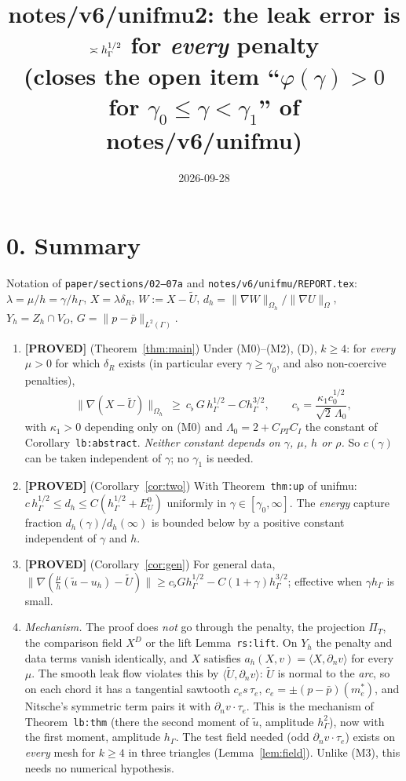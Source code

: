 \documentclass[11pt]{article}
\title{notes/v6/unifmu2: the leak error is $\asymp\hG^{1/2}$ for \emph{every} penalty\\
\large (closes the open item ``$\varphi(\gamma)>0$ for $\gamma_0\le\gamma<\gamma_1$'' of notes/v6/unifmu)}
\date{2026-09-28}
\theoremstyle{remark}
\newcommand{\hG}{h_\Gamma}
\newcommand{\Oh}{\Omega_h}
\newcommand{\Zh}{Z_h}
\newcommand{\Yh}{Y_h}
\newcommand{\norm}[1]{\|#1\|}
\newcommand{\ip}[2]{\langle #1,#2\rangle}
\newcommand{\dn}{\partial_n}
\newcommand{\Ut}{\tilde U}
\newcommand{\ut}{\tilde u}
\newcommand{\pbar}{\bar p}
\newcommand{\lab}[1]{\textbf{[#1]}}
\begin{document}
\maketitle

\section*{0. Summary}
Notation of \texttt{paper/sections/02--07a} and \texttt{notes/v6/unifmu/REPORT.tex}: $\lambda=\mu/h=\gamma/\hG$, $X=\lambda\delta_R$, $W:=X-\Ut$, $d_h=\norm{\nabla W}_{\Oh}/\norm{\nabla U}_\Omega$, $\Yh=\Zh\cap V_O$, $G=\norm{p-\pbar}_{L^2(\Gamma)}$.

\begin{enumerate}[label=(\alph*)]
\item \lab{PROVED} (Theorem~\ref{thm:main}) Under (M0)--(M2), (D), $k\ge4$: for \emph{every} $\mu>0$ for which $\delta_R$ exists (in particular every $\gamma\ge\gamma_0$, and also non-coercive penalties),
\[
\norm{\nabla(X-\Ut)}_{\Oh}\ \ge\ c_\flat\,G\,\hG^{1/2}-C\hG^{3/2},\qquad c_\flat=\frac{\kappa_1c_0^{1/2}}{\sqrt2\,\Lambda_0},
\]
with $\kappa_1>0$ depending only on (M0) and $\Lambda_0=2+C_{PT}C_I$ the constant of Corollary~\texttt{lb:abstract}. \emph{Neither constant depends on $\gamma$, $\mu$, $h$ or $\rho$.} So $c(\gamma)$ can be taken independent of $\gamma$; no $\gamma_1$ is needed.
\item \lab{PROVED} (Corollary~\ref{cor:two}) With Theorem~\texttt{thm:up} of unifmu: $c\,\hG^{1/2}\le d_h\le C(\hG^{1/2}+E^0_U)$ uniformly in $\gamma\in[\gamma_0,\infty]$. The \emph{energy} capture fraction $d_h(\gamma)/d_h(\infty)$ is bounded below by a positive constant independent of $\gamma$ and $h$.
\item \lab{PROVED} (Corollary~\ref{cor:gen}) For general data, $\norm{\nabla(\frac\mu h(\ut-u_h)-\Ut)}\ge c_\flat G\hG^{1/2}-C(1+\gamma)\hG^{3/2}$; effective when $\gamma\hG$ is small.
\item \emph{Mechanism.} The proof does \emph{not} go through the penalty, the projection $\Pi_T$, the comparison field $X^D$ or the lift Lemma~\texttt{rs:lift}. On $\Yh$ the penalty and data terms vanish identically, and $X$ satisfies $a_h(X,v)=\ip{X}{\dn v}$ for every $\mu$. The smooth leak flow violates this by $\ip{\Ut}{\dn v}$: $\Ut$ is normal to the \emph{arc}, so on each chord it has a tangential sawtooth $c_e s\,\tau_e$, $c_e=\pm(p-\pbar)(m_e^\ast)$, and Nitsche's symmetric term pairs it with $\dn v\cdot\tau_e$. This is the mechanism of Theorem~\texttt{lb:thm} (there the second moment of $\ut$, amplitude $\hG^2$), now with the first moment, amplitude $\hG$. The test field needed (odd $\dn v\cdot\tau_e$) exists on \emph{every} mesh for $k\ge4$ in three triangles (Lemma~\ref{lem:field}). Unlike (M3), this needs no numerical hypothesis.

\end{enumerate}
\end{document}
